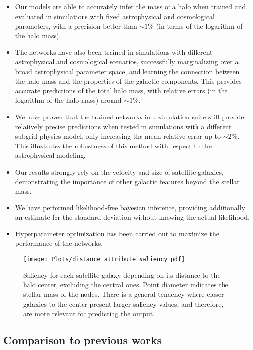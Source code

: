 \documentclass[twocolumn]{aastex631}
\begin{document}
\begin{itemize}
    \item Our models are able to accurately infer the mass of a halo when trained and evaluated in simulations with fixed astrophysical and cosmological parameters, with a precision better than $\sim 1$\% (in terms of the logarithm of the halo mass).
    \item The networks have also been trained in simulations with different astrophysical and cosmological scenarios, successfully marginalizing over a broad astrophysical parameter space, and learning the connection between the halo mass and the properties of the galactic components. This provides accurate predictions of the total halo mass, with relative errors (in the logarithm of the halo mass) around $\sim 1$\%.
    \item We have proven that the trained networks in a simulation suite still provide relatively precise predictions when tested in simulations with a different subgrid physics model, only increasing the mean relative error up to $\sim 2$\%. This illustrates the robustness of this method with respect to the astrophysical modeling.
    \item Our results strongly rely on the velocity and size of satellite galaxies, demonstrating the importance of other galactic features beyond the stellar mass.
    \item We have performed likelihood-free bayesian inference, providing additionally an estimate for the standard deviation without knowing the actual likelihood.
    \item Hyperparameter optimization has been carried out to maximize the performance of the networks. 
\end{itemize}


   

\begin{figure}[t!]
\begin{center}
\texttt{[image: Plots/distance\_attribute\_saliency.pdf]}
\caption{Saliency for each satellite galaxy depending on its distance to the halo center, excluding the central ones. Point diameter indicates the stellar mass of the nodes. There is a general tendency where closer galaxies to the center present larger saliency values, and therefore, are more relevant for predicting the output.}
\label{fig:distances}
\end{center}
\end{figure}

\subsection{Comparison to previous works}
\end{document}
